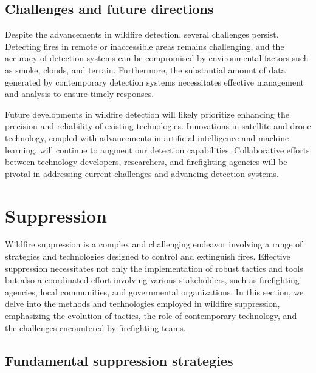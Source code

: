 \documentclass[
  12 pt,
]{Nemilov}
\begin{document}
\subsection{Challenges and future directions}\label{challenges-and-future-directions}

Despite the advancements in wildfire detection, several challenges persist. Detecting fires in remote or inaccessible areas remains challenging, and the accuracy of detection systems can be compromised by environmental factors such as smoke, clouds, and terrain. Furthermore, the substantial amount of data generated by contemporary detection systems necessitates effective management and analysis to ensure timely responses.

Future developments in wildfire detection will likely prioritize enhancing the precision and reliability of existing technologies. Innovations in satellite and drone technology, coupled with advancements in artificial intelligence and machine learning, will continue to augment our detection capabilities. Collaborative efforts between technology developers, researchers, and firefighting agencies will be pivotal in addressing current challenges and advancing detection systems.

\section{Suppression}\label{suppression}

Wildfire suppression is a complex and challenging endeavor involving a range of strategies and technologies designed to control and extinguish fires. Effective suppression necessitates not only the implementation of robust tactics and tools but also a coordinated effort involving various stakeholders, such as firefighting agencies, local communities, and governmental organizations. In this section, we delve into the methods and technologies employed in wildfire suppression, emphasizing the evolution of tactics, the role of contemporary technology, and the challenges encountered by firefighting teams.

\subsection{Fundamental suppression strategies}\label{fundamental-suppression-strategies}
\end{document}
